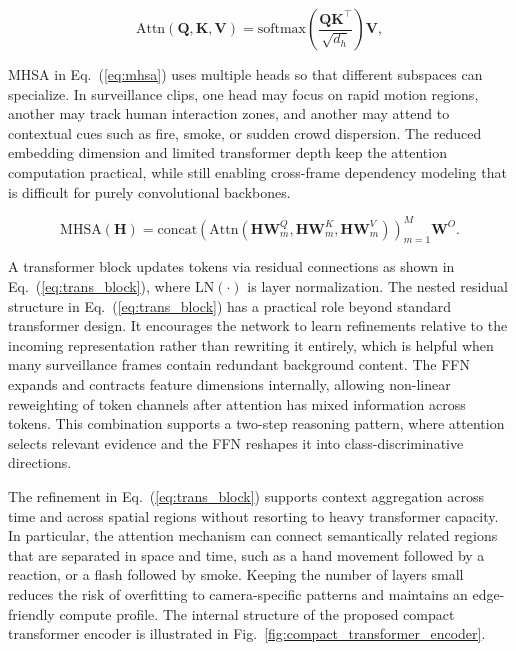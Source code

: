 \documentclass[AMA,Times1COL]{WileyNJDv5} %
\begin{document}
\begin{equation}
\mathrm{Attn}(\mathbf{Q},\mathbf{K},\mathbf{V}) = 
\mathrm{softmax}\!\left(\frac{\mathbf{Q}\mathbf{K}^{\top}}{\sqrt{d_h}}\right)\mathbf{V},
\label{eq:attn_core}
\end{equation}

MHSA in Eq.~(\ref{eq:mhsa}) uses multiple heads so that different subspaces can specialize. In surveillance clips, one head may focus on rapid motion regions, another may track human interaction zones, and another may attend to contextual cues such as fire, smoke, or sudden crowd dispersion. The reduced embedding dimension and limited transformer depth keep the attention computation practical, while still enabling cross-frame dependency modeling that is difficult for purely convolutional backbones.

\begin{equation}
\mathrm{MHSA}(\mathbf{H}) = \mathrm{concat}\!\left(\mathrm{Attn}(\mathbf{H}\mathbf{W}^Q_m,\mathbf{H}\mathbf{W}^K_m,\mathbf{H}\mathbf{W}^V_m)\right)_{m=1}^{M}\mathbf{W}^O .
\label{eq:mhsa}
\end{equation}

A transformer block updates tokens via residual connections as shown in Eq.~(\ref{eq:trans_block}), where $\mathrm{LN}(\cdot)$ is layer normalization. The nested residual structure in Eq.~(\ref{eq:trans_block}) has a practical role beyond standard transformer design. It encourages the network to learn refinements relative to the incoming representation rather than rewriting it entirely, which is helpful when many surveillance frames contain redundant background content. The FFN expands and contracts feature dimensions internally, allowing non-linear reweighting of token channels after attention has mixed information across tokens. This combination supports a two-step reasoning pattern, where attention selects relevant evidence and the FFN reshapes it into class-discriminative directions.

The refinement in Eq.~(\ref{eq:trans_block}) supports context aggregation across time and across spatial regions without resorting to heavy transformer capacity. In particular, the attention mechanism can connect semantically related regions that are separated in space and time, such as a hand movement followed by a reaction, or a flash followed by smoke. Keeping the number of layers small reduces the risk of overfitting to camera-specific patterns and maintains an edge-friendly compute profile. The internal structure of the proposed compact transformer encoder is illustrated in Fig.~\ref{fig:compact_transformer_encoder}.
\end{document}
